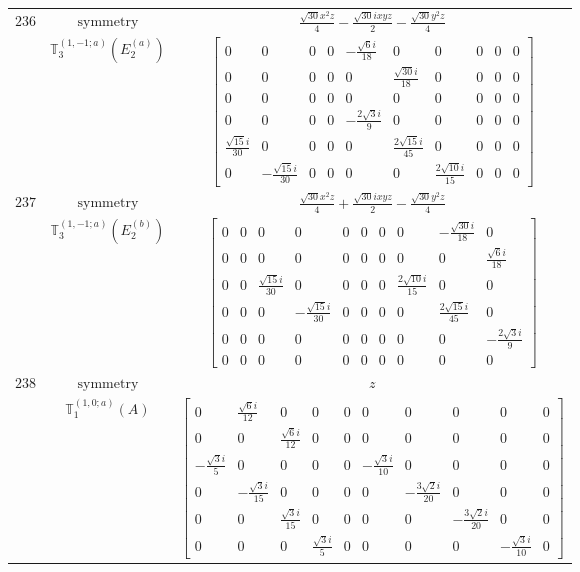 \documentclass[fleqn,8pt,landscape]{jsarticle}
\begin{document}
\begin{longtable}{ccc}
$ 236 $ & $ \text{symmetry} $ & $ \frac{\sqrt{30} x^{2} z}{4} - \frac{\sqrt{30} i x y z}{2} - \frac{\sqrt{30} y^{2} z}{4} $ \\
$  $ & $ \mathbb{T}_{3}^{(1,-1;a)}(E_{2}^{(a)}) $ & $ \begin{bmatrix} 0 & 0 & 0 & 0 & - \frac{\sqrt{6} i}{18} & 0 & 0 & 0 & 0 & 0 \\ 0 & 0 & 0 & 0 & 0 & \frac{\sqrt{30} i}{18} & 0 & 0 & 0 & 0 \\ 0 & 0 & 0 & 0 & 0 & 0 & 0 & 0 & 0 & 0 \\ 0 & 0 & 0 & 0 & - \frac{2 \sqrt{3} i}{9} & 0 & 0 & 0 & 0 & 0 \\ \frac{\sqrt{15} i}{30} & 0 & 0 & 0 & 0 & \frac{2 \sqrt{15} i}{45} & 0 & 0 & 0 & 0 \\ 0 & - \frac{\sqrt{15} i}{30} & 0 & 0 & 0 & 0 & \frac{2 \sqrt{10} i}{15} & 0 & 0 & 0 \end{bmatrix} $ \\ \hline
$ 237 $ & $ \text{symmetry} $ & $ \frac{\sqrt{30} x^{2} z}{4} + \frac{\sqrt{30} i x y z}{2} - \frac{\sqrt{30} y^{2} z}{4} $ \\
$  $ & $ \mathbb{T}_{3}^{(1,-1;a)}(E_{2}^{(b)}) $ & $ \begin{bmatrix} 0 & 0 & 0 & 0 & 0 & 0 & 0 & 0 & - \frac{\sqrt{30} i}{18} & 0 \\ 0 & 0 & 0 & 0 & 0 & 0 & 0 & 0 & 0 & \frac{\sqrt{6} i}{18} \\ 0 & 0 & \frac{\sqrt{15} i}{30} & 0 & 0 & 0 & 0 & \frac{2 \sqrt{10} i}{15} & 0 & 0 \\ 0 & 0 & 0 & - \frac{\sqrt{15} i}{30} & 0 & 0 & 0 & 0 & \frac{2 \sqrt{15} i}{45} & 0 \\ 0 & 0 & 0 & 0 & 0 & 0 & 0 & 0 & 0 & - \frac{2 \sqrt{3} i}{9} \\ 0 & 0 & 0 & 0 & 0 & 0 & 0 & 0 & 0 & 0 \end{bmatrix} $ \\ \hline
$ 238 $ & $ \text{symmetry} $ & $ z $ \\
$  $ & $ \mathbb{T}_{1}^{(1,0;a)}(A) $ & $ \begin{bmatrix} 0 & \frac{\sqrt{6} i}{12} & 0 & 0 & 0 & 0 & 0 & 0 & 0 & 0 \\ 0 & 0 & \frac{\sqrt{6} i}{12} & 0 & 0 & 0 & 0 & 0 & 0 & 0 \\ - \frac{\sqrt{3} i}{5} & 0 & 0 & 0 & 0 & - \frac{\sqrt{3} i}{10} & 0 & 0 & 0 & 0 \\ 0 & - \frac{\sqrt{3} i}{15} & 0 & 0 & 0 & 0 & - \frac{3 \sqrt{2} i}{20} & 0 & 0 & 0 \\ 0 & 0 & \frac{\sqrt{3} i}{15} & 0 & 0 & 0 & 0 & - \frac{3 \sqrt{2} i}{20} & 0 & 0 \\ 0 & 0 & 0 & \frac{\sqrt{3} i}{5} & 0 & 0 & 0 & 0 & - \frac{\sqrt{3} i}{10} & 0 \end{bmatrix} $ \\ \hline

\end{longtable}
\end{document}
